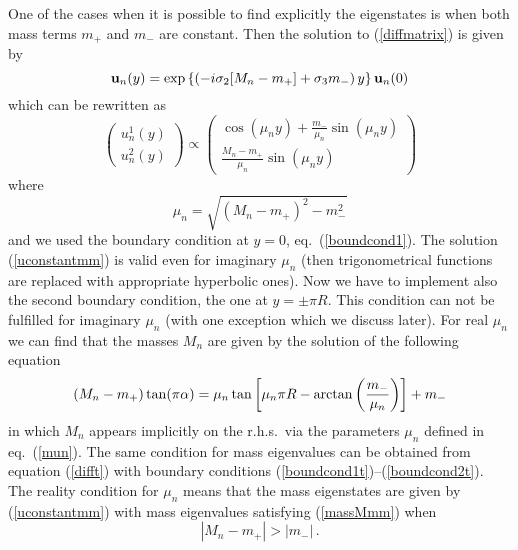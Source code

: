 \documentclass[a4paper,12pt]{article}
\def\arctan{{\rm arctan}}
\def\si{\sigma}
\def\al{\alpha}
\def\bu{{\bf u}}
\begin{document}
One of the cases when it is possible to find explicitly the
eigenstates is when both mass terms $m_+$ and $m_-$ are 
constant. Then the solution to (\ref{diffmatrix}) is given by
\begin{equation}
\bu_n(y)
=
\exp\left\{\left(
-i\si_2[M_n-m_+]+\si_3m_-\right)y\right\}\bu_n(0)
\end{equation}
which can be rewritten as
\begin{equation}
\left(
\begin{array}{c}
u_n^1(y)
\\[6pt]
u_n^2(y)
\end{array}
\right)
\propto
\left(
\begin{array}{c}
\cos\left(\mu_n y\right)
+\frac{m_-}{\mu_n}
\sin\left(\mu_n y\right)
\\[6pt]
\frac{M_n-m_+}{\mu_n}
\sin\left(\mu_n y\right)
\end{array}
\right)
\label{uconstantmm}
\end{equation}
where
\begin{equation}
\mu_n=\sqrt{(M_n-m_+)^2-m_-^2}
\label{mun}
\end{equation}
and we used the boundary condition at $y=0$, eq.\ (\ref{boundcond1}).
The solution (\ref{uconstantmm}) is valid even for imaginary $\mu_n$
(then trigonometrical functions are replaced with appropriate
hyperbolic ones). Now we have to implement also the second
boundary condition, the one at $y=\pm\pi R$. This condition can not be
fulfilled  for imaginary $\mu_n$ (with one exception which we discuss
later). For real $\mu_n$ we can find that the masses
$M_n$ are given by the solution of the following equation
\begin{equation}
(M_n-m_+)\tan(\pi\al)
=
\mu_n
\tan\left[\mu_n\pi R
-
\arctan\left(\frac{m_-}{\mu_n}\right)
\right]
+m_-
\label{massMmm}
\end{equation}
in which $M_n$ appears implicitly on the r.h.s.\ via the parameters
$\mu_n$ defined in eq.\ (\ref{mun}). The same condition for mass
eigenvalues can be obtained from equation (\ref{difft}) with boundary
conditions (\ref{boundcond1t})--(\ref{boundcond2t}).
The reality condition for $\mu_n$ means that the mass eigenstates are
given by (\ref{uconstantmm}) with mass eigenvalues satisfying
(\ref{massMmm}) when
\begin{equation}
\left|M_n-m_+\right| > \left|m_-\right|
\,.
\end{equation}
\end{document}
